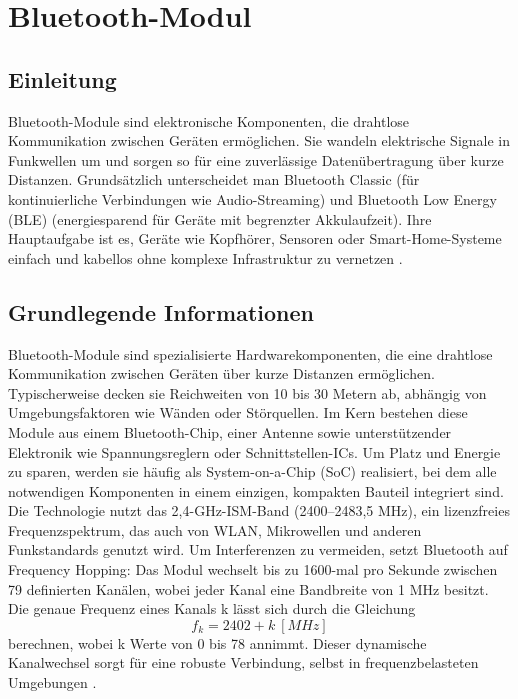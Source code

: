 %
%
%


\chapter{Bluetooth-Modul} \label{Bluetooth}

\section{Einleitung}
Bluetooth-Module sind elektronische Komponenten, die drahtlose Kommunikation zwischen Geräten ermöglichen. Sie wandeln elektrische Signale in Funkwellen um und sorgen so für eine  zuverlässige Datenübertragung über kurze Distanzen. Grundsätzlich unterscheidet man Bluetooth Classic (für kontinuierliche Verbindungen wie Audio-Streaming) und Bluetooth Low Energy (BLE) (energiesparend für Geräte mit begrenzter Akkulaufzeit). Ihre Hauptaufgabe ist es, Geräte wie Kopfhörer, Sensoren oder Smart-Home-Systeme einfach und kabellos ohne komplexe Infrastruktur zu vernetzen \cite{Sauter:2022}.

\section{Grundlegende Informationen}
Bluetooth-Module sind spezialisierte Hardwarekomponenten, die eine drahtlose Kommunikation zwischen Geräten über kurze Distanzen ermöglichen. Typischerweise decken sie Reichweiten von 10 bis 30 Metern ab, abhängig von Umgebungsfaktoren wie Wänden oder Störquellen. Im Kern bestehen diese Module aus einem Bluetooth-Chip, einer Antenne sowie unterstützender Elektronik wie Spannungsreglern oder Schnittstellen-ICs. Um Platz und Energie zu sparen, werden sie häufig als System-on-a-Chip (SoC) realisiert, bei dem alle notwendigen Komponenten in einem einzigen, kompakten Bauteil integriert sind.
Die Technologie nutzt das 2,4-GHz-ISM-Band (2400–2483,5 MHz), ein lizenzfreies Frequenzspektrum, das auch von WLAN, Mikrowellen und anderen Funkstandards genutzt wird. Um Interferenzen zu vermeiden, setzt Bluetooth auf Frequency Hopping: Das Modul wechselt bis zu 1600-mal pro Sekunde zwischen 79 definierten Kanälen, wobei jeder Kanal eine Bandbreite von 1 MHz besitzt. Die genaue Frequenz eines Kanals k lässt sich durch die Gleichung
\begin{equation}
	f_k =2402+k \: [MHz] 
\end{equation}
berechnen, wobei k Werte von 0 bis 78 annimmt. Dieser dynamische Kanalwechsel sorgt für eine robuste Verbindung, selbst in frequenzbelasteten Umgebungen \cite{Sauter:2022}.

